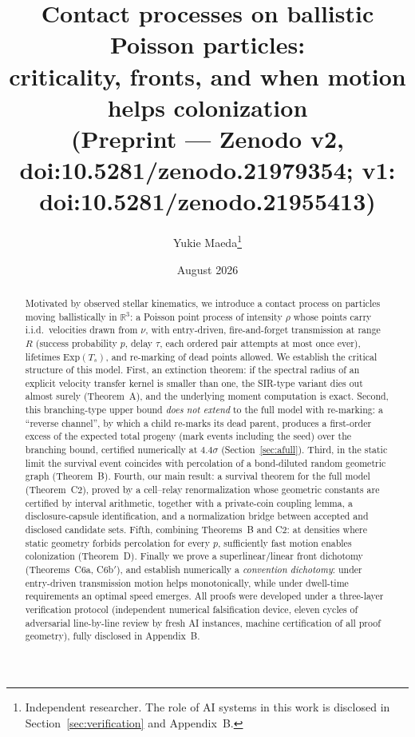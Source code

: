 \documentclass[11pt]{article}
\title{Contact processes on ballistic Poisson particles:\\
criticality, fronts, and when motion helps colonization\\[1ex]
\large (Preprint --- Zenodo v2, doi:10.5281/zenodo.21979354; v1: doi:10.5281/zenodo.21955413)}
\author{Yukie Maeda\thanks{Independent researcher. The role of AI systems in this
work is disclosed in Section~\ref{sec:verification} and Appendix~B.}}
\date{August 2026}
\newcommand{\R}{\mathbb{R}}
\newcommand{\Ts}{T_s}
\begin{document}
\maketitle

\begin{abstract}
Motivated by observed stellar kinematics, we introduce a contact process on
particles moving ballistically in $\R^3$: a Poisson point process of intensity
$\rho$ whose points carry i.i.d.\ velocities drawn from $\nu$, with
entry-driven, fire-and-forget transmission at range $R$ (success probability
$p$, delay $\tau$, each ordered pair attempts at most once ever), lifetimes
$\mathrm{Exp}(\Ts)$, and re-marking of dead points allowed. We establish the
critical structure of this model. First, an extinction theorem: if the
spectral radius of an explicit velocity transfer kernel is smaller than one,
the SIR-type variant dies out almost surely (Theorem~A), and the underlying
moment computation is exact. Second, this branching-type upper bound
\emph{does not extend} to the full model with re-marking: a
``reverse channel'', by which a child re-marks its dead parent, produces a
first-order excess of the expected total progeny (mark events including the
seed) over the branching bound, certified numerically at
$4.4\sigma$ (Section~\ref{sec:afull}). Third, in the static limit the
survival event coincides with percolation of a bond-diluted random geometric
graph (Theorem~B). Fourth, our main result: a survival theorem for the full
model (Theorem~C2), proved by a cell--relay renormalization whose geometric
constants are certified by interval arithmetic, together with a
private-coin coupling lemma, a disclosure-capsule identification, and a
normalization bridge between accepted and disclosed candidate sets. Fifth,
combining Theorems~B and C2: at densities where static geometry forbids
percolation for every $p$, sufficiently fast motion enables colonization
(Theorem~D). Finally we prove a superlinear/linear front dichotomy
(Theorems~C6a, C6b$'$), and establish numerically a \emph{convention
dichotomy}: under entry-driven transmission motion helps monotonically,
while under dwell-time requirements an optimal speed emerges. All proofs
were developed under a three-layer verification protocol (independent
numerical falsification device, eleven cycles of adversarial line-by-line
review by fresh AI instances, machine certification of all proof geometry),
fully disclosed in Appendix~B.
\end{abstract}

\tableofcontents
\end{document}
